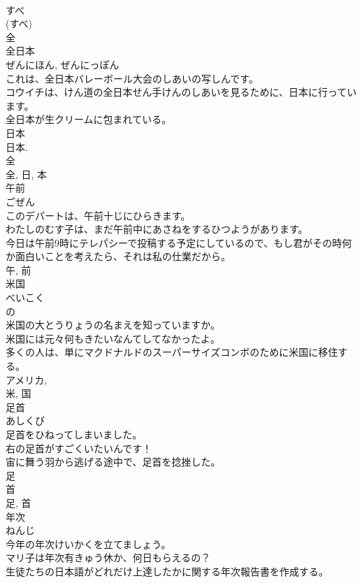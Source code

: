 \documentclass[8pt]{extreport}
\begin{document}
\begin{CJK}{UTF8}{min}
\\	すべ 
\\	(すべ) 
\\	全	
\\	全日本	
\\	ぜんにほん, ぜんにっぽん	
\\	これは、全日本バレーボール大会のしあいの写しんです。	
\\	コウイチは、けん道の全日本せん手けんのしあいを見るために、日本に行っています。	
\\	全日本が生クリームに包まれている。	
\\	日本 
\\	日本. 
\\	全 
\\	全, 日, 本	
\\	午前	
\\	ごぜん	
\\	このデパートは、午前十じにひらきます。	
\\	わたしのむす子は、まだ午前中にあさねをするひつようがあります。	
\\	今日は午前9時にテレパシーで投稿する予定にしているので、もし君がその時何か面白いことを考えたら、それは私の仕業だから。	
\\	午, 前	
\\	米国	
\\	べいこく	
\\	の 
\\	米国の大とうりょうの名まえを知っていますか。	
\\	米国には元々何もきたいなんてしてなかったよ。	
\\	多くの人は、単にマクドナルドのスーパーサイズコンボのために米国に移住する。	
\\	アメリカ, 
\\	米, 国	
\\	足首	
\\	あしくび	
\\	足首をひねってしまいました。	
\\	右の足首がすごくいたいんです！	
\\	宙に舞う羽から逃げる途中で、足首を捻挫した。	
\\	足 
\\	首 
\\	足, 首	
\\	年次	
\\	ねんじ	
\\	今年の年次けいかくを立てましょう。	
\\	マリ子は年次有きゅう休か、何日もらえるの？	
\\	生徒たちの日本語がどれだけ上達したかに関する年次報告書を作成する。	

\end{CJK}
\end{document}
